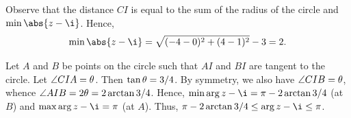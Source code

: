 \begin{solution}
\begin{ppart}
\begin{center}
        \end{center}
    \end{ppart}
    \begin{ppart}
        Observe that the distance $CI$ is equal to the sum of the radius of the circle and $\min \abs{z - \i}$. Hence, \[\min \abs{z - \i} = \sqrt{(-4 - 0)^2 + (4 - 1)^2} - 3 = 2.\]
    \end{ppart}
    \begin{ppart}
        Let $A$ and $B$ be points on the circle such that $AI$ and $BI$ are tangent to the circle. Let $\angle CIA = \theta$. Then $\tan \theta = 3/4$. By symmetry, we also have $\angle CIB = \theta$, whence $\angle AIB = 2\theta = 2\arctan{3/4}$. Hence, $\min \arg{z -\i} = \pi - 2\arctan{3/4}$ (at $B$) and $\max \arg{z - \i} = \pi$ (at $A$). Thus, $\pi - 2\arctan{3/4} \leq \arg{z-\i} \leq \pi$.
    \end{ppart}
\end{solution}

